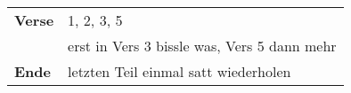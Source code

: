 
\begin{tabular}{p{1.6cm}l}
	\textbf{Verse} & 1, 2, 3, 5                                  \\
	               & erst in Vers 3 bissle was, Vers 5 dann mehr \\
	\textbf{Ende}  & letzten Teil einmal satt wiederholen        \\
\end{tabular}
